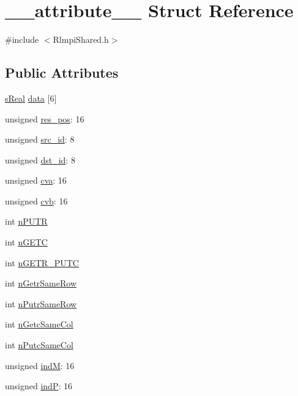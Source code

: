 \hypertarget{struct____attribute____}{}\section{\+\_\+\+\_\+attribute\+\_\+\+\_\+ Struct Reference}
\label{struct____attribute____}


{\ttfamily \#include $<$Rlmpi\+Shared.\+h$>$}

\subsection*{Public Attributes}
\begin{DoxyCompactItemize}
\item 
\mbox{\hyperlink{include_2RlmpiShared_8h_af4148c3e44f31072c9b97e63e56bbde3}{s\+Real}} \mbox{\hyperlink{struct____attribute_____a9c5480ea0eef3f0de01687a9789fa444}{data}} \mbox{[}6\mbox{]}
\item 
unsigned \mbox{\hyperlink{struct____attribute_____a5520bd158c9067709c4581ee299ffb68}{res\+\_\+pos}}\+: 16
\item 
unsigned \mbox{\hyperlink{struct____attribute_____ab5ad54f2c28857af1bdac6584a3a1968}{src\+\_\+id}}\+: 8
\item 
unsigned \mbox{\hyperlink{struct____attribute_____abffd4da5aef1ba4854e7a81d14f86864}{dst\+\_\+id}}\+: 8
\item 
unsigned \mbox{\hyperlink{struct____attribute_____a0a82a10490ace7b38ae29ea0fb5fa7cd}{cva}}\+: 16
\item 
unsigned \mbox{\hyperlink{struct____attribute_____aba60a8b53615d05d77f736cb79afce4a}{cvb}}\+: 16
\item 
int \mbox{\hyperlink{struct____attribute_____aca7a5080435e36e62172756495e61b3b}{n\+P\+U\+TR}}
\item 
int \mbox{\hyperlink{struct____attribute_____a308fce32ca5f5670acc3f8d2073ab32d}{n\+G\+E\+TC}}
\item 
int \mbox{\hyperlink{struct____attribute_____a2d6aee77358153fff1c39b11895af6a2}{n\+G\+E\+T\+R\+\_\+\+P\+U\+TC}}
\item 
int \mbox{\hyperlink{struct____attribute_____a24f192574d106edbf269fa991e5b857e}{n\+Getr\+Same\+Row}}
\item 
int \mbox{\hyperlink{struct____attribute_____ac39c8684fd7d72438a65c2a17976e3b3}{n\+Putr\+Same\+Row}}
\item 
int \mbox{\hyperlink{struct____attribute_____a236aeba42ccf5515e5e3d75a98fadfbb}{n\+Getc\+Same\+Col}}
\item 
int \mbox{\hyperlink{struct____attribute_____a73b0f642eca0d1cd54815fd381727332}{n\+Putc\+Same\+Col}}
\item 
unsigned \mbox{\hyperlink{struct____attribute_____a215d68d123f74d9c49d41e3f21cc84ed}{indM}}\+: 16
\item 
unsigned \mbox{\hyperlink{struct____attribute_____aebaa365507fa4ca28d858516a653e5a7}{indP}}\+: 16
\end{DoxyCompactItemize}


